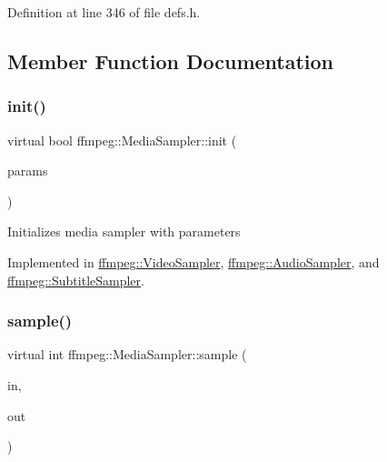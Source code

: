 Definition at line 346 of file defs.\+h.



\subsection{Member Function Documentation}
\mbox{\label{classffmpeg_1_1MediaSampler_a049962d62fc930c67d6cf5aa89ae1948}} 
\subsubsection{\texorpdfstring{init()}{init()}}
{\footnotesize\ttfamily virtual bool ffmpeg\+::\+Media\+Sampler\+::init (\begin{DoxyParamCaption}\item[{const \hyperlink{structffmpeg_1_1SamplerParameters}{Sampler\+Parameters} \&}]{params }\end{DoxyParamCaption})\hspace{0.3cm}{\ttfamily [pure virtual]}}

Initializes media sampler with parameters 

Implemented in \hyperlink{classffmpeg_1_1VideoSampler_a8004cb1c8f7608f24dc84144e0de0c3e}{ffmpeg\+::\+Video\+Sampler}, \hyperlink{classffmpeg_1_1AudioSampler_a90df92f5b3a265e0cfa9ee44d9e8871b}{ffmpeg\+::\+Audio\+Sampler}, and \hyperlink{classffmpeg_1_1SubtitleSampler_a352ab0faeb54596825ca1edd4406b72c}{ffmpeg\+::\+Subtitle\+Sampler}.

\mbox{\label{classffmpeg_1_1MediaSampler_a1e13816018edada455769f027cf5e9dd}} 
\subsubsection{\texorpdfstring{sample()}{sample()}}
{\footnotesize\ttfamily virtual int ffmpeg\+::\+Media\+Sampler\+::sample (\begin{DoxyParamCaption}\item[{const \hyperlink{classffmpeg_1_1ByteStorage}{Byte\+Storage} $\ast$}]{in,  }\item[{\hyperlink{classffmpeg_1_1ByteStorage}{Byte\+Storage} $\ast$}]{out }\end{DoxyParamCaption})\hspace{0.3cm}{\ttfamily [pure virtual]}}

